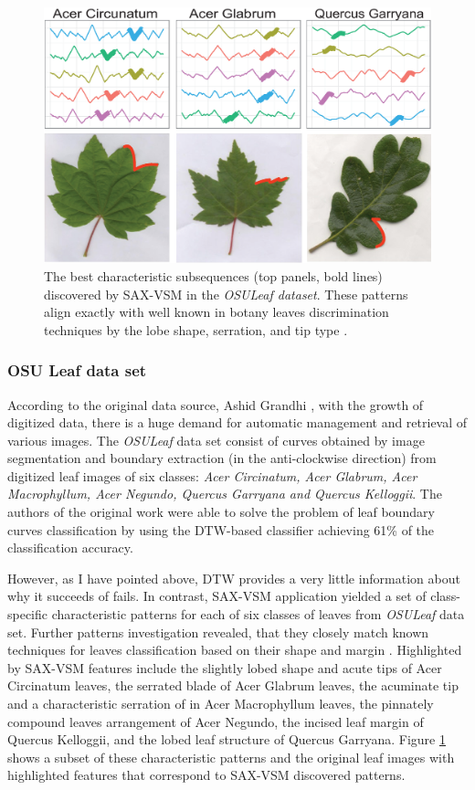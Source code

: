 \begin{figure}[!h]
   \centering
   \includegraphics[width=130mm]{figures/AcerCircunatum.eps}
   \caption{The best characteristic subsequences (top panels, bold lines) discovered by SAX-VSM in
    the \textit{OSULeaf dataset}. These patterns align exactly with well known in botany leaves discrimination techniques
    by the lobe shape, serration, and tip type \cite{citeulike:12134192}.}
   \label{fig:shapelet-acer-patterns}
\end{figure}

\subsubsection{OSU Leaf data set}
According to the original data source, Ashid Grandhi \cite{citeulike:12563798}, with the growth of digitized data, 
there is a huge demand for automatic management and retrieval of various images. 
The \textit{OSULeaf} data set consist of curves obtained by image segmentation and boundary
extraction (in the anti-clockwise direction) from digitized leaf images of six classes: \textit{Acer
Circinatum, Acer Glabrum, Acer Macrophyllum, Acer Negundo, Quercus Garryana and Quercus Kelloggii}.
The authors of the original work were able to solve the problem of leaf boundary curves classification by using 
the DTW-based classifier achieving 61\% of the classification accuracy. 

However, as I have pointed above, DTW provides a very little information about why it succeeds of fails. 
In contrast, SAX-VSM application yielded a set of class-specific characteristic patterns for each 
of six classes of leaves from \textit{OSULeaf} data set. Further patterns investigation revealed, that they closely 
match known techniques for leaves classification based on their shape and margin \cite{citeulike:12134192}. 
Highlighted by SAX-VSM features include 
the slightly lobed shape and acute tips of Acer Circinatum leaves, 
the serrated blade of Acer Glabrum leaves, 
the acuminate tip and a characteristic serration of in Acer Macrophyllum leaves, 
the pinnately compound leaves arrangement of Acer Negundo, 
the incised leaf margin of Quercus Kelloggii, 
and the lobed leaf structure of Quercus Garryana. 
Figure \ref{fig:shapelet-acer-patterns} shows a subset of these characteristic patterns and the original
leaf images with highlighted features that correspond to SAX-VSM discovered patterns.

